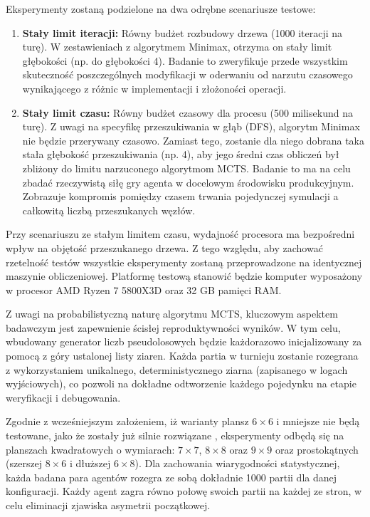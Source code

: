 \documentclass{article}
\begin{document}
Eksperymenty zostaną podzielone na dwa odrębne scenariusze testowe:
\begin{enumerate}
    \item \textbf{Stały limit iteracji:} Równy budżet rozbudowy drzewa (1000 iteracji na turę). W zestawieniach z algorytmem Minimax, otrzyma on stały limit głębokości (np. do głębokości 4). Badanie to zweryfikuje przede wszystkim skuteczność poszczególnych modyfikacji w oderwaniu od narzutu czasowego wynikającego z różnic w implementacji i złożoności operacji.
    \item \textbf{Stały limit czasu:} Równy budżet czasowy dla procesu (500 milisekund na turę). Z uwagi na specyfikę przeszukiwania w głąb (DFS), algorytm Minimax nie będzie przerywany czasowo. Zamiast tego, zostanie dla niego dobrana taka stała głębokość przeszukiwania (np. 4), aby jego średni czas obliczeń był zbliżony do limitu narzuconego algorytmom MCTS. Badanie to ma na celu zbadać rzeczywistą siłę gry agenta w docelowym środowisku produkcyjnym. Zobrazuje kompromis pomiędzy czasem trwania pojedynczej symulacji a całkowitą liczbą przeszukanych węzłów.
\end{enumerate}

Przy scenariuszu ze stałym limitem czasu, wydajność procesora ma bezpośredni wpływ na objętość przeszukanego drzewa. Z tego względu, aby zachować rzetelność testów wszystkie eksperymenty zostaną przeprowadzone na identycznej maszynie obliczeniowej. Platformę testową stanowić będzie komputer wyposażony w procesor AMD Ryzen 7 5800X3D oraz 32 GB pamięci RAM.

Z uwagi na probabilistyczną naturę algorytmu MCTS, kluczowym aspektem badawczym jest zapewnienie ścisłej reproduktywności wyników. W tym celu, wbudowany generator liczb pseudolosowych będzie każdorazowo inicjalizowany za pomocą z góry ustalonej listy ziaren. Każda partia w turnieju zostanie rozegrana z wykorzystaniem unikalnego, deterministycznego ziarna (zapisanego w logach wyjściowych), co pozwoli na dokładne odtworzenie każdego pojedynku na etapie weryfikacji i debugowania.

Zgodnie z wcześniejszym założeniem, iż warianty plansz $6 \times 6$ i mniejsze nie będą testowane, jako że zostały już silnie rozwiązane \cite{saffidine2012solving}, eksperymenty odbędą się na planszach kwadratowych o wymiarach: $7 \times 7$, $8 \times 8$ oraz $9 \times 9$ oraz prostokątnych (szerszej $8 \times 6$ i dłuższej $6 \times 8$). Dla zachowania wiarygodności statystycznej, każda badana para agentów rozegra ze sobą dokładnie 1000 partii dla danej konfiguracji. Każdy agent zagra równo połowę swoich partii na każdej ze stron, w celu eliminacji zjawiska asymetrii początkowej.
\end{document}
